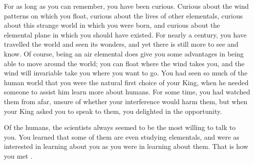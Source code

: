 \documentclass[char]{elementals}
\begin{document}
\name{\cNaturalist{}}

For as long as you can remember, you have been curious.  Curious about the wind patterns on which you float, curious about the lives of other elementals, curious about this strange world in which you were born, and curious about the elemental plane in which you should have existed.  For nearly a century, you have travelled the world and seen its wonders, and yet there is still more to see and know.  Of course, being an air elemental does give you some advantages in being able to move around the world; you can float where the wind takes you, and the wind will invariable take you where you want to go.  You had seen so much of the human world that you were the natural first choice of your King, \cairKing{\intro} when he needed someone to assist him learn more about humans.  For some time, you had watched them from afar, unsure of whether your interference would harm them, but when your King asked you to speak to them, you delighted in the opportunity.


Of the humans, the scientists always seemed to be the most willing to talk to you.  You learned that some of them are even studying elementals, and were as interested in learning about you as you were in learning about them.  That is how you met \cgrandDaughter{\intro}.

\end{document}
